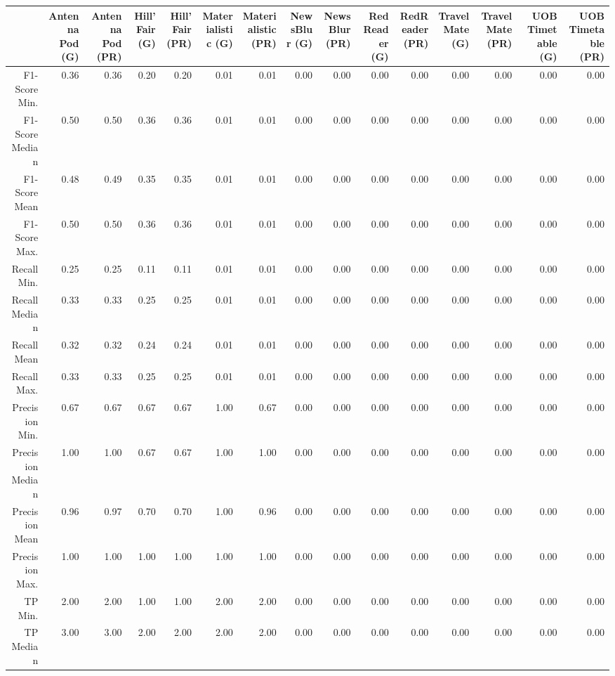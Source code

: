 \begin{table}[ht]
\centering
\begin{tabular}{rrrrrrrrrrrrrrr}
  \hline
 & Antenna Pod (G) & Antenna Pod (PR) & Hill'Fair (G) & Hill'Fair (PR) & Materialistic (G) & Materialistic (PR) & NewsBlur (G) & NewsBlur (PR) & RedReader (G) & RedReader (PR) & Travel Mate (G) & Travel Mate (PR) & UOB Timetable (G) & UOB Timetable (PR) \\ 
  \hline
F1-Score Min. & 0.36 & 0.36 & 0.20 & 0.20 & 0.01 & 0.01 & 0.00 & 0.00 & 0.00 & 0.00 & 0.00 & 0.00 & 0.00 & 0.00 \\ 
  F1-Score Median & 0.50 & 0.50 & 0.36 & 0.36 & 0.01 & 0.01 & 0.00 & 0.00 & 0.00 & 0.00 & 0.00 & 0.00 & 0.00 & 0.00 \\ 
  F1-Score Mean & 0.48 & 0.49 & 0.35 & 0.35 & 0.01 & 0.01 & 0.00 & 0.00 & 0.00 & 0.00 & 0.00 & 0.00 & 0.00 & 0.00 \\ 
  F1-Score Max. & 0.50 & 0.50 & 0.36 & 0.36 & 0.01 & 0.01 & 0.00 & 0.00 & 0.00 & 0.00 & 0.00 & 0.00 & 0.00 & 0.00 \\ 
  Recall Min. & 0.25 & 0.25 & 0.11 & 0.11 & 0.01 & 0.01 & 0.00 & 0.00 & 0.00 & 0.00 & 0.00 & 0.00 & 0.00 & 0.00 \\ 
  Recall Median & 0.33 & 0.33 & 0.25 & 0.25 & 0.01 & 0.01 & 0.00 & 0.00 & 0.00 & 0.00 & 0.00 & 0.00 & 0.00 & 0.00 \\ 
  Recall Mean & 0.32 & 0.32 & 0.24 & 0.24 & 0.01 & 0.01 & 0.00 & 0.00 & 0.00 & 0.00 & 0.00 & 0.00 & 0.00 & 0.00 \\ 
  Recall Max. & 0.33 & 0.33 & 0.25 & 0.25 & 0.01 & 0.01 & 0.00 & 0.00 & 0.00 & 0.00 & 0.00 & 0.00 & 0.00 & 0.00 \\ 
  Precision Min. & 0.67 & 0.67 & 0.67 & 0.67 & 1.00 & 0.67 & 0.00 & 0.00 & 0.00 & 0.00 & 0.00 & 0.00 & 0.00 & 0.00 \\ 
  Precision Median & 1.00 & 1.00 & 0.67 & 0.67 & 1.00 & 1.00 & 0.00 & 0.00 & 0.00 & 0.00 & 0.00 & 0.00 & 0.00 & 0.00 \\ 
  Precision Mean & 0.96 & 0.97 & 0.70 & 0.70 & 1.00 & 0.96 & 0.00 & 0.00 & 0.00 & 0.00 & 0.00 & 0.00 & 0.00 & 0.00 \\ 
  Precision Max. & 1.00 & 1.00 & 1.00 & 1.00 & 1.00 & 1.00 & 0.00 & 0.00 & 0.00 & 0.00 & 0.00 & 0.00 & 0.00 & 0.00 \\ 
  TP Min. & 2.00 & 2.00 & 1.00 & 1.00 & 2.00 & 2.00 & 0.00 & 0.00 & 0.00 & 0.00 & 0.00 & 0.00 & 0.00 & 0.00 \\ 
  TP Median & 3.00 & 3.00 & 2.00 & 2.00 & 2.00 & 2.00 & 0.00 & 0.00 & 0.00 & 0.00 & 0.00 & 0.00 & 0.00 & 0.00 \\ 

\end{tabular}
\end{table}
